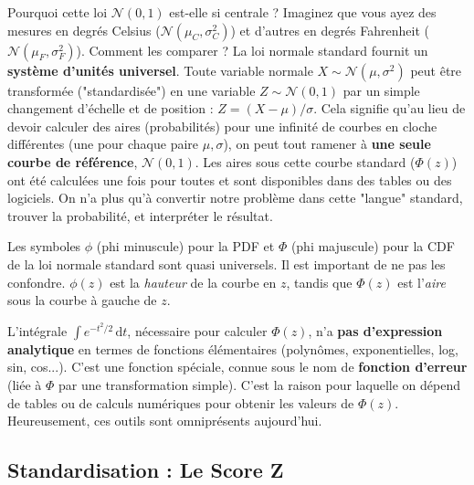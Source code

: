 \begin{intuitionbox}
Pourquoi cette loi $\mathcal{N}(0, 1)$ est-elle si centrale ? Imaginez que vous ayez des mesures en degrés Celsius ($\mathcal{N}(\mu_C, \sigma_C^2)$) et d'autres en degrés Fahrenheit ($\mathcal{N}(\mu_F, \sigma_F^2)$). Comment les comparer ? La loi normale standard fournit un \textbf{système d'unités universel}.
\newline
Toute variable normale $X \sim \mathcal{N}(\mu, \sigma^2)$ peut être transformée ("standardisée") en une variable $Z \sim \mathcal{N}(0, 1)$ par un simple changement d'échelle et de position : $Z = (X-\mu)/\sigma$. 
\newline
Cela signifie qu'au lieu de devoir calculer des aires (probabilités) pour une infinité de courbes en cloche différentes (une pour chaque paire $\mu, \sigma$), on peut tout ramener à \textbf{une seule courbe de référence}, $\mathcal{N}(0, 1)$. Les aires sous cette courbe standard ($\Phi(z)$) ont été calculées une fois pour toutes et sont disponibles dans des tables ou des logiciels. On n'a plus qu'à convertir notre problème dans cette "langue" standard, trouver la probabilité, et interpréter le résultat.
\end{intuitionbox}

\begin{remarquebox}
Les symboles $\phi$ (phi minuscule) pour la PDF et $\Phi$ (phi majuscule) pour la CDF de la loi normale standard sont quasi universels. Il est important de ne pas les confondre. $\phi(z)$ est la \textit{hauteur} de la courbe en $z$, tandis que $\Phi(z)$ est l'\textit{aire} sous la courbe à gauche de $z$.
\end{remarquebox}

\begin{remarquebox}
L'intégrale $\int e^{-t^2/2} \, \mathrm{d}t$, nécessaire pour calculer $\Phi(z)$, n'a \textbf{pas d'expression analytique} en termes de fonctions élémentaires (polynômes, exponentielles, log, sin, cos...). C'est une fonction spéciale, connue sous le nom de \textbf{fonction d'erreur} (liée à $\Phi$ par une transformation simple). C'est la raison pour laquelle on dépend de tables ou de calculs numériques pour obtenir les valeurs de $\Phi(z)$. Heureusement, ces outils sont omniprésents aujourd'hui.
\end{remarquebox}

\subsection{Standardisation : Le Score Z}

